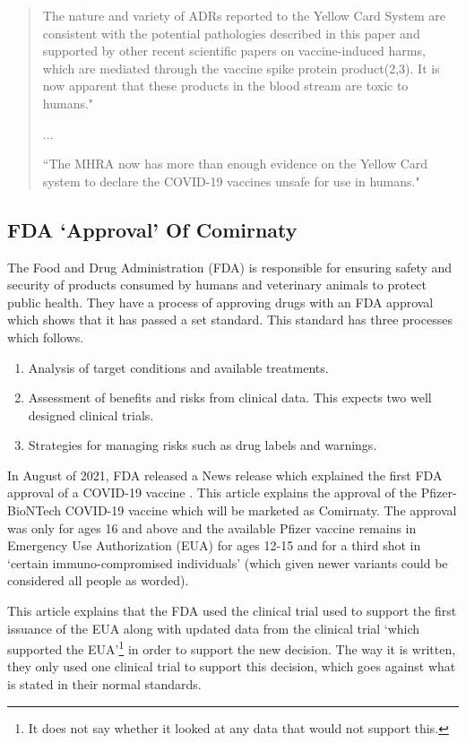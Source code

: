 \documentclass[10pt, a4paper, twocolumn]{book}
\begin{document}
\begin{quotation}
	The nature and variety of ADRs reported to the Yellow Card System are consistent with the potential pathologies described in this paper and supported by other recent scientific papers on vaccine-induced harms, which are mediated through the vaccine spike protein product(2,3). It is now apparent that these products in the blood stream are toxic to humans."
	
	...
	
	``The MHRA now has more than enough evidence on the Yellow Card system to declare the COVID-19 vaccines unsafe for use in humans."
\end{quotation}











\subsection{FDA `Approval' Of Comirnaty}

The Food and Drug Administration (FDA) is responsible for ensuring safety and security of products consumed by humans and veterinary animals to protect public health. They have a process of approving drugs with an FDA approval which shows that it has passed a set standard. This standard has three processes which follows.

\begin{enumerate}
	\item Analysis of target conditions and available treatments.
	\item Assessment of benefits and risks from clinical data. This expects two well designed clinical trials.
	\item Strategies for managing risks such as drug labels and warnings.
\end{enumerate}

In August of 2021, FDA released a News release which explained the first FDA approval of a COVID-19 vaccine \citep{FDAApprovesCOVIDVaccine}. This article explains the approval of the Pfizer-BioNTech COVID-19 vaccine which will be marketed as Comirnaty. The approval was only for ages 16 and above and the available Pfizer vaccine remains in Emergency Use Authorization (EUA) for ages 12-15 and for a third shot in `certain immuno-compromised individuals' (which given newer variants could be considered all people as worded).

This article explains that the FDA used the clinical trial used to support the first issuance of the EUA along with updated data from the clinical trial `which supported the EUA'\footnote{It does not say whether it looked at any data that would not support this.} in order to support the new decision. The way it is written, they only used one clinical trial to support this decision, which goes against what is stated in their normal standards.
\end{document}

